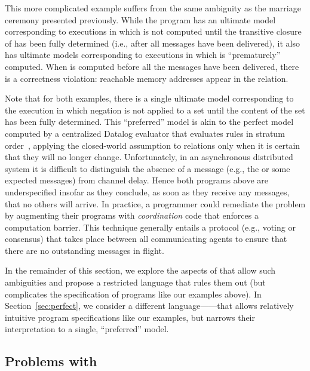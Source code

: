 This more complicated example suffers from the same ambiguity as the marriage
ceremony presented previously.  While the program has an ultimate model
corresponding to executions in which  is not computed until the
transitive closure of  has been fully determined (i.e.,
after all messages have been delivered), it also has ultimate models
corresponding to executions in which  is ``prematurely''
computed.  When  is computed before all the 
messages have been delivered, there is a correctness violation: reachable memory
addresses appear in the  relation.

Note that for both examples, there is a single ultimate model corresponding to
the execution in which negation is not applied to a set until the content of the
set has been fully determined.  This ``preferred'' model is akin to the perfect
model computed by a centralized Datalog evaluator that evaluates rules in
stratum order~\cite{ullmanbook}, applying the closed-world assumption to
relations only when it is certain that they will no longer change.
Unfortunately, in an asynchronous distributed system it is difficult to
distinguish the absence of a message (e.g., the  or some
expected  messages) from channel delay.  Hence both programs
above are underspecified insofar as they conclude, as soon as they receive any
messages, that no others will arrive.  In practice, a programmer could remediate
the problem by augmenting their programs with \emph{coordination} code that
enforces a computation barrier.  This technique generally entails a protocol
(e.g., voting or consensus) that takes place between all communicating agents to
ensure that there are no outstanding messages in flight.

In the remainder of this section, we explore the aspects of \lang that allow
such ambiguities and propose a restricted language \slang that rules them out
(but complicates the specification of programs like our examples above).  In
Section~\ref{sec:perfect}, we consider a different language---\plang---that allows
relatively intuitive program specifications like our examples, but narrows their
interpretation to a single, ``preferred'' model.

\subsection{Problems with \large \bf \lang}

